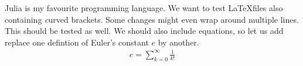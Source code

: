 Julia is  my favourite programming language.
We want to test \LaTeX files also containing {\textit curved brackets}.
Some changes might even wrap around multiple lines.
This should be tested as well.
We should also include equations, so let us add replace one defintion of Euler's constant $e$ by another.
\begin{align}
e = \sum_{k = 0}^{\infty} \frac{1}{k!}
\end{align}
